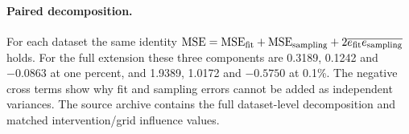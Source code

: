 \documentclass[11pt]{article}
\theoremstyle{definition}\newtheorem{definition}[theorem]{Definition}
\theoremstyle{remark}\newtheorem{remark}[theorem]{Remark}
\begin{document}
\begin{table}[htbp]
\caption{Training-only Wishart--CIR fits. All use $b=6$ and select $\rho=-0.7$ on the stated grid. CRSP rows here report parameter fits, not completed forecast panels. $K_{\rm fit}$ is the finite-day conditional-moment estimate used in fitting, rather than the frozen-mixture formula. Full covariance, drift, moment features and candidate objectives are archived.}\label{tab:wc-fits}

\end{table}

\paragraph{Paired decomposition.}

For each dataset the same identity $\mathrm{MSE}=\mathrm{MSE}_{\rm fit}+\mathrm{MSE}_{\rm sampling}+2\overline{e_{\rm fit}e_{\rm sampling}}$ holds. For the full extension these three components are 0.3189, 0.1242 and $-0.0863$ at one percent, and 1.9389, 1.0172 and $-0.5750$ at 0.1\%. The negative cross terms show why fit and sampling errors cannot be added as independent variances. The source archive contains the full dataset-level decomposition and matched intervention/grid influence values.
\end{document}

